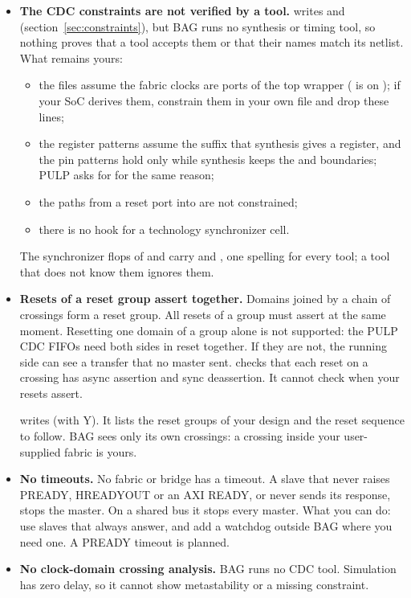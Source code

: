 \begin{itemize}
\item \textbf{The CDC constraints are not verified by a tool.}  writes
   and  (section~\ref{sec:constraints}), but
  BAG runs no synthesis or timing tool, so nothing proves that a tool accepts them or that
  their names match its netlist. What remains yours:
  \begin{itemize}
  \item the files assume the fabric clocks are ports of the top wrapper
    ( is on ); if your SoC derives them, constrain them in
    your own file and drop these lines;
  \item the register patterns assume the  suffix that synthesis gives a
    register, and the pin patterns hold only while synthesis keeps the  and
     boundaries; PULP asks for  for the same reason;
  \item the paths from a reset port into  are not constrained;
  \item there is no hook for a technology synchronizer cell.
  \end{itemize}
  The synchronizer flops of  and  carry
   and , one spelling for every tool; a tool that does not
  know them ignores them.
\item \textbf{Resets of a reset group assert together.} Domains joined by a chain of
  crossings form a reset group. All resets of a group must assert at the same moment.
  Resetting one domain of a group alone is not supported: the PULP CDC FIFOs need both
  sides in reset together. If they are not, the running side can see a transfer that no
  master sent.  checks that each reset on a crossing has async
  assertion and sync deassertion. It cannot check when your resets assert.

   writes  (with 
  Y). It lists the reset groups of your design and the reset sequence to follow. BAG
  sees only its own crossings: a crossing inside your user-supplied fabric is yours.
\item \textbf{No timeouts.} No fabric or bridge has a timeout. A slave that never raises
  PREADY, HREADYOUT or an AXI READY, or never sends its response, stops the master. On a
  shared bus it stops every master. What you can do: use slaves that always answer, and
  add a watchdog outside BAG where you need one. A PREADY timeout is planned.
\item \textbf{No clock-domain crossing analysis.} BAG runs no CDC tool. Simulation has
  zero delay, so it cannot show metastability or a missing constraint.
\end{itemize}

